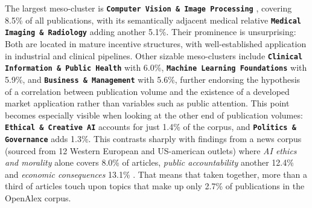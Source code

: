 \documentclass{article}
\begin{document}
	The largest meso-cluster is \textbf{\texttt{Computer Vision \& Image Processing}} , covering 8.5\% of all publications, with its semantically adjacent medical relative \textbf{\texttt{Medical Imaging \& Radiology}}  adding another 5.1\%. Their prominence is unsurprising: Both are located in mature incentive structures, with well-established application in industrial and clinical pipelines. Other sizable meso-clusters include \textbf{\texttt{Clinical Information \& Public Health}}  with 6.0\%, \textbf{\texttt{Machine Learning Foundations}}  with 5.9\%, and \textbf{\texttt{Business \& Management}}  with 5.6\%, further endorsing the hypothesis of a correlation between publication volume and the existence of a developed market application rather than variables such as public attention. This point becomes especially visible when looking at the other end of publication volumes: \textbf{\texttt{Ethical \& Creative AI}}  accounts for just 1.4\% of the corpus, and \textbf{\texttt{Politics \& Governance}}  adds 1.3\%. This contrasts sharply with findings from a news corpus (sourced from 12 Western European and US-american outlets) where \textit{AI ethics and morality} alone covers 8.0\% of articles, \textit{public accountability} another 12.4\% and \textit{economic consequences} 13.1\% \cite{Zai2025Voices}. That means that taken together, more than a third of articles touch upon topics that make up only 2.7\% of publications in the OpenAlex corpus.
	
\end{document}

